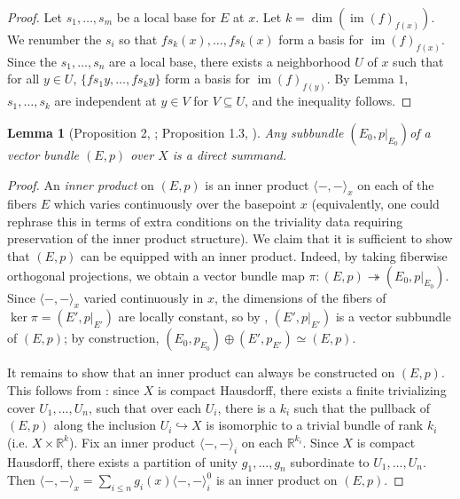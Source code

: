 \documentclass[11pt]{article}
\newcommand{\im}{\operatorname{im}}
\renewcommand{\ker}{\operatorname{ker}}
\theoremstyle{plain}
\newtheorem{lemma}{Lemma}[section]
\theoremstyle{definition}
\begin{document}
\begin{proof}
  Let \(s_1, \dots, s_m\) be a local base for \(E\) at \(x\). Let \(k = \dim(\im(f)_{f(x)})\). We renumber the \(s_i\) so that \(fs_k(x), \dots, fs_k(x)\) form a basis for \(\im(f)_{f(x)}\). Since the \(s_1, \dots, s_n\) are a local base, there exists a neighborhood \(U\) of \(x\) such that for all \(y \in U\), \(\{fs_1y, \dots, fs_ky\}\) form a basis for \(\im(f)_{f(y)}\). By Lemma \(1\), \(s_1, \dots, s_k\) are independent at \(y \in V\) for \(V \subseteq U\), and the inequality follows.
\end{proof}


\begin{lemma}[Proposition 2, \cite{swan1962vector}; Proposition 1.3, \cite{hatcher2003vector}] \label{lemma:proposition-2}
  Any subbundle \((E_0, p|_{E_0})\)of a vector bundle \((E,p)\) over \(X\) is a direct summand.
\end{lemma}

\begin{proof} %
  An \emph{inner product} on \((E,p)\) is an inner product \(\langle -,- \rangle_x\) on each of the fibers \(E\) which varies continuously over the basepoint \(x\) (equivalently, one could rephrase this in terms of extra conditions on the triviality data requiring preservation of the inner product structure). We claim that it is sufficient to show that \((E,p)\) can be equipped with an inner product. Indeed, by taking fiberwise orthogonal projections, we obtain a vector bundle map \(\pi : (E, p) \twoheadrightarrow (E_0, p|_{E_0})\). Since \(\langle -,- \rangle_x\) varied continuously in \(x\), the dimensions of the fibers of \(\ker \pi = (E', p|_{E'})\) are locally constant, so by , \((E', p|_{E'})\) is a vector subbundle of \((E,p)\); by construction, \((E_0, p_{E_0}) \oplus (E', p_{E'}) \simeq (E,p)\).

  It remains to show that an inner product can always be constructed on \((E,p)\). This follows from : since \(X\) is compact Hausdorff, there exists a finite trivializing cover \(U_1, \dots, U_n\), such that over each \(U_i\), there is a \(k_i\) such that the pullback of \((E,p)\) along the inclusion \(U_i \hookrightarrow X\) is isomorphic to a trivial bundle of rank \(k_i\) (i.e. \(X \times \mathbb{R}^k\)). Fix an inner product \(\langle -,- \rangle_i\) on each \(\mathbb{R}^{k_i}\). Since \(X\) is compact Hausdorff, there exists a partition of unity \(g_1, \dots, g_n\) subordinate to \(U_1, \dots, U_n\). Then \(\langle -,- \rangle_x = \sum_{i \leq n} g_i(x) \langle -,- \rangle^0_{i}\) is an inner product on \((E,p)\).
\end{proof}
\end{document}
